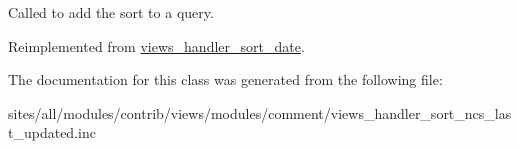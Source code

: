 Called to add the sort to a query. 

Reimplemented from \hyperlink{classviews__handler__sort__date_3d3680d96fee82a746bac50c051016a8}{views\_\-handler\_\-sort\_\-date}.

The documentation for this class was generated from the following file:\begin{CompactItemize}
\item 
sites/all/modules/contrib/views/modules/comment/views\_\-handler\_\-sort\_\-ncs\_\-last\_\-updated.inc\end{CompactItemize}
